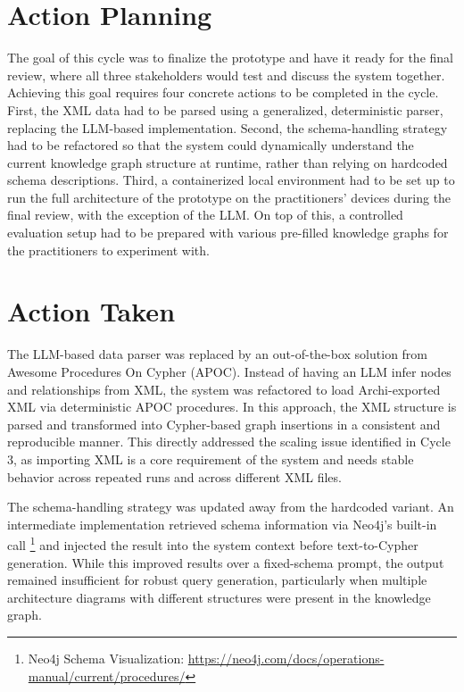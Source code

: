 \section{Action Planning}
\label{sec:cycle4_planning}
The goal of this cycle was to finalize the prototype and have it ready for the final review, where all three stakeholders would test and discuss the system together. Achieving this goal requires four concrete actions to be completed in the cycle. First, the XML data had to be parsed using a generalized, deterministic parser, replacing the LLM-based implementation. Second, the schema-handling strategy had to be refactored so that the system could dynamically understand the current knowledge graph structure at runtime, rather than relying on hardcoded schema descriptions. Third, a containerized local environment had to be set up to run the full architecture of the prototype on the practitioners' devices during the final review, with the exception of the LLM. On top of this, a controlled evaluation setup had to be prepared with various pre-filled knowledge graphs for the practitioners to experiment with.

\section{Action Taken}
\label{sec:cycle4_actionTaken}
The LLM-based data parser was replaced by an out-of-the-box solution from Awesome Procedures On Cypher (APOC). Instead of having an LLM infer nodes and relationships from XML, the system was refactored to load Archi-exported XML via deterministic APOC procedures. In this approach, the XML structure is parsed and transformed into Cypher-based graph insertions in a consistent and reproducible manner. This directly addressed the scaling issue identified in Cycle 3, as importing XML is a core requirement of the system and needs stable behavior across repeated runs and across different XML files.

The schema-handling strategy was updated away from the hardcoded variant. An intermediate implementation retrieved schema information via Neo4j’s built-in call \footnote{Neo4j Schema Visualization: \url{https://neo4j.com/docs/operations-manual/current/procedures/}} and injected the result into the system context before text-to-Cypher generation. While this improved results over a fixed-schema prompt, the output remained insufficient for robust query generation, particularly when multiple architecture diagrams with different structures were present in the knowledge graph.

